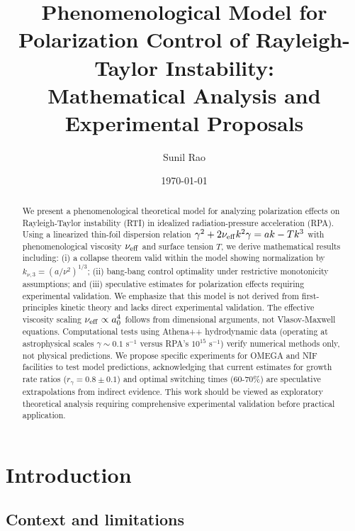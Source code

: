 \documentclass[aps,pre,twocolumn,showpacs,superscriptaddress]{revtex4-2}
\theoremstyle{definition}
\begin{document}
\title{Phenomenological Model for Polarization Control of Rayleigh-Taylor Instability:\\
Mathematical Analysis and Experimental Proposals}

\author{Sunil Rao}

\date{\today}

\begin{abstract}
We present a phenomenological theoretical model for analyzing polarization effects on Rayleigh-Taylor instability (RTI) in idealized radiation-pressure acceleration (RPA). Using a linearized thin-foil dispersion relation $\gamma^2+2\nu_{\rm eff}k^2\gamma=ak-Tk^3$ with phenomenological viscosity $\nu_{\rm eff}$ and surface tension $T$, we derive mathematical results including: (i) a collapse theorem valid within the model showing normalization by $k_{\nu,3}=(a/\nu^2)^{1/3}$; (ii) bang-bang control optimality under restrictive monotonicity assumptions; and (iii) speculative estimates for polarization effects requiring experimental validation. We emphasize that this model is not derived from first-principles kinetic theory and lacks direct experimental validation. The effective viscosity scaling $\nu_{\rm eff} \propto a_0^4$ follows from dimensional arguments, not Vlasov-Maxwell equations. Computational tests using Athena++ hydrodynamic data (operating at astrophysical scales $\gamma \sim 0.1$ s$^{-1}$ versus RPA's $10^{15}$ s$^{-1}$) verify numerical methods only, not physical predictions. We propose specific experiments for OMEGA and NIF facilities to test model predictions, acknowledging that current estimates for growth rate ratios ($r_\gamma = 0.8 \pm 0.1$) and optimal switching times (60-70\%) are speculative extrapolations from indirect evidence. This work should be viewed as exploratory theoretical analysis requiring comprehensive experimental validation before practical application.
\end{abstract}

\maketitle

\section{Introduction}\label{sec:intro}

\subsection{Context and limitations}
\end{document}
